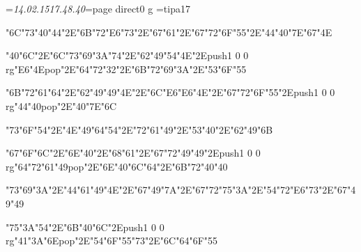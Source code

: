\footline={\tenrm\it 14.02.15\hfill\folio\hfill17.48.40}\chardef\match=\pdfcolorstackinit page direct{0 g} \font\ipa=tipa17 \pdfpagewidth 5.5in \pdfpageheight 8.5in \hsize 4.5in \vsize 7in \hoffset -0.5in \voffset -0.375in
\null\vfill
\centerline{\ipa\char"6C\ipa\char"73\ipa\char"40\ipa\char"44\ipa\char"2E\ipa\char"6B\ipa\char"72\ipa\char"E6\ipa\char"73\ipa\char"2E\ipa\char"67\ipa\char"61\ipa\char"2E\ipa\char"67\ipa\char"72\ipa\char"6F\ipa\char"55\ipa\char"2E\ipa\char"44\ipa\char"40\ipa\char"7E\ipa\char"67\ipa\char"4E}\bigskip
\centerline{\ipa\char"40\ipa\char"6C\ipa\char"2E\ipa\char"6C\ipa\char"73\ipa\char"69\ipa\char"3A\ipa\char"74\ipa\char"2E\ipa\char"62\ipa\char"49\ipa\char"54\ipa\char"4E\ipa\char"2E\pdfcolorstack\match push{1 0 0 rg}\ipa\char"E6\ipa\char"4E\pdfcolorstack\match pop{}\ipa\char"2E\ipa\char"64\ipa\char"72\ipa\char"32\ipa\char"2E\ipa\char"6B\ipa\char"72\ipa\char"69\ipa\char"3A\ipa\char"2E\ipa\char"53\ipa\char"6F\ipa\char"55}\bigskip
\centerline{\ipa\char"6B\ipa\char"72\ipa\char"61\ipa\char"64\ipa\char"2E\ipa\char"62\ipa\char"49\ipa\char"49\ipa\char"4E\ipa\char"2E\ipa\char"6C\ipa\char"E6\ipa\char"E6\ipa\char"4E\ipa\char"2E\ipa\char"67\ipa\char"72\ipa\char"6F\ipa\char"55\ipa\char"2E\pdfcolorstack\match push{1 0 0 rg}\ipa\char"44\ipa\char"40\pdfcolorstack\match pop{}\ipa\char"2E\ipa\char"40\ipa\char"7E\ipa\char"6C}
\vfill\eject
\null\vfill
\centerline{\ipa\char"73\ipa\char"6F\ipa\char"54\ipa\char"2E\ipa\char"4E\ipa\char"49\ipa\char"64\ipa\char"54\ipa\char"2E\ipa\char"72\ipa\char"61\ipa\char"49\ipa\char"2E\ipa\char"53\ipa\char"40\ipa\char"2E\ipa\char"62\ipa\char"49\ipa\char"6B}\bigskip
\centerline{\ipa\char"67\ipa\char"6F\ipa\char"6C\ipa\char"2E\ipa\char"6E\ipa\char"40\ipa\char"2E\ipa\char"68\ipa\char"61\ipa\char"2E\ipa\char"67\ipa\char"72\ipa\char"49\ipa\char"49\ipa\char"2E\pdfcolorstack\match push{1 0 0 rg}\ipa\char"64\ipa\char"72\ipa\char"61\ipa\char"49\pdfcolorstack\match pop{}\ipa\char"2E\ipa\char"6E\ipa\char"40\ipa\char"6C\ipa\char"64\ipa\char"2E\ipa\char"6B\ipa\char"72\ipa\char"40\ipa\char"40}\bigskip
\centerline{\ipa\char"73\ipa\char"69\ipa\char"3A\ipa\char"2E\ipa\char"44\ipa\char"61\ipa\char"49\ipa\char"4E\ipa\char"2E\ipa\char"67\ipa\char"49\ipa\char"7A\ipa\char"2E\ipa\char"67\ipa\char"72\ipa\char"75\ipa\char"3A\ipa\char"2E\ipa\char"54\ipa\char"72\ipa\char"E6\ipa\char"73\ipa\char"2E\ipa\char"67\ipa\char"49\ipa\char"49}
\vfill\eject
\null\vfill
\centerline{\ipa\char"75\ipa\char"3A\ipa\char"54\ipa\char"2E\ipa\char"6B\ipa\char"40\ipa\char"6C\ipa\char"2E\pdfcolorstack\match push{1 0 0 rg}\ipa\char"41\ipa\char"3A\ipa\char"6E\pdfcolorstack\match pop{}\ipa\char"2E\ipa\char"54\ipa\char"6F\ipa\char"55\ipa\char"73\ipa\char"2E\ipa\char"6C\ipa\char"64\ipa\char"6F\ipa\char"55}\bigskip
